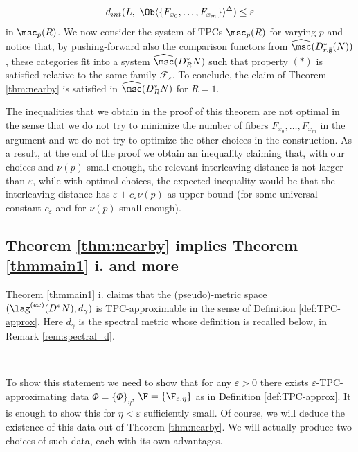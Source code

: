  $$d_{int}(L,\ \Ob \langle \{ F_{x_{0}},\ldots, F_{x_{m}}\}\rangle ^{\Delta } ) \leq \varepsilon $$ in $\msc_{\bar{p}}(R)$.
 We now consider the system of TPCs $\msc_{\bar{p}}(R)$ for varying
 $p$ and notice that, by pushing-forward also the comparison 
 functors from $\widehat{\msc}(D^{\ast}_{r,\bar{\mathtt{g}}}(N))$,
 these categories fit into a system $\widehat{\msc}(D^{\ast}_{R}N)$
 such that property $(\ast)$ is satisfied relative to the same family
 $\mathcal{F}_{\varepsilon}$. To conclude, the claim of Theorem \ref{thm:nearby} is satisfied in $\widehat{\msc}(D^{\ast}_{R}N)$
 for $R=1$.
 
 \begin{rem}\label{rem:loose} The inequalities that we obtain in the proof
 of this theorem are not optimal in the sense that we do not try to minimize the number
 of fibers $F_{x_{0}}, \ldots, F_{x_{m}}$ in the argument and we do not try to optimize the other choices in the construction.  As a result,  at the end of the proof we obtain an inequality claiming that, with our choices and $\nu(p)$ small enough, the relevant interleaving distance is not larger than $\varepsilon$, while with optimal choices, the expected inequality would be that the interleaving distance has $\varepsilon +c_{\varepsilon}\nu(p)$ as upper bound (for some universal constant $c_{\varepsilon}$ and for $\nu(p)$ small enough). 
 \end{rem}
 
 \subsection{Theorem \ref{thm:nearby} implies Theorem \ref{thmmain1} i. and more}\label{subsec:nearby-TPC}
 
 Theorem \ref{thmmain1} i. claims that the (pseudo)-metric space $(\lag^{(ex)}(D^{\ast}N), d_{\gamma})$ is TPC-approximable in the sense of  Definition \ref{def:TPC-approx}.  Here $d_{\gamma}$ is the spectral metric whose 
 definition is recalled below, in Remark \ref{rem:spectral_d}.
 
 \
 
To show this statement we need to show that for any $\varepsilon>0$ there exists $\varepsilon$-TPC-approximating
data $\Phi=\{\Phi\}_{\eta}$, $\F=\{\F_{\varepsilon,\eta}\}$ as in Definition \ref{def:TPC-approx}. 
It is enough to show this for $\eta < \varepsilon$ sufficiently small.
Of course, we will
 deduce the existence of this data out of Theorem \ref{thm:nearby}. 
 We will actually produce two choices of such data, each with its own advantages. 
  
